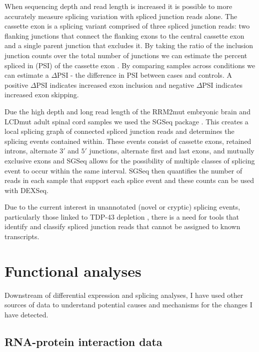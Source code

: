 When sequencing depth and read length is increased it is possible to more accurately measure splicing variation with spliced junction reads alone. The cassette exon is a splicing variant comprised of three spliced junction reads: two flanking junctions that connect the flanking exons to the central cassette exon and a single parent junction that excludes it. By taking the ratio of the inclusion junction counts over the total number of junctions we can estimate the percent spliced in (PSI) of the cassette exon \citep{Katz2010-ir}. By comparing samples across conditions we can estimate a $\Delta$PSI - the difference in PSI between cases and controls. A positive $\Delta$PSI indicates increased exon inclusion and negative $\Delta$PSI indicates increased exon skipping. 

Due the high depth and long read length of the RRM2mut embryonic brain and LCDmut adult spinal cord samples we used the SGSeq package \citep{Goldstein2016}. This creates a local splicing graph of connected spliced junction reads and determines the splicing events contained within. These events consist of cassette exons, retained introns, alternate $3'$ and $5'$ junctions, alternate first and last exons, and mutually exclusive exons and SGSeq allows for the possibility of multiple classes of splicing event to occur within  the same interval. SGSeq  then quantifies  the number of  reads in each sample  that support each splice event and these counts can be used with DEXSeq. 

Due to the current interest in unannotated (novel or cryptic) splicing events, particularly those linked to TDP-43 depletion \citep{Humphrey2017, Ling2015}, there is a need for tools that identify and classify spliced junction reads that cannot be assigned to known transcripts. 



\section{Functional analyses}

Downstream of differential expression and splicing analyses, I have used other sources of data to understand potential causes and mechanisms for the changes I have detected.

\subsection{RNA-protein interaction data}

